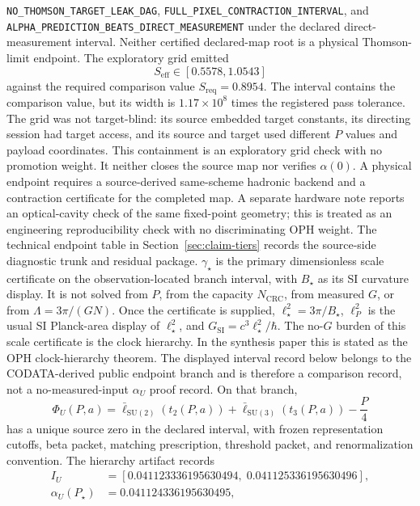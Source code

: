 \documentclass[11pt]{article}
\begin{document}
\texttt{NO\_\allowbreak THOMSON\_\allowbreak TARGET\_\allowbreak LEAK\_\allowbreak DAG},
\texttt{FULL\_\allowbreak PIXEL\_\allowbreak CONTRACTION\_\allowbreak INTERVAL}, and
\texttt{ALPHA\_\allowbreak PREDICTION\_\allowbreak BEATS\_\allowbreak DIRECT\_\allowbreak MEASUREMENT} under the
declared direct-measurement interval.
Neither certified declared-map root is a physical Thomson-limit endpoint. The
exploratory grid emitted
\[
S_{\mathrm{eff}}\in[0.5578,1.0543]
\]
against the required comparison value \(S_{\mathrm{req}}=0.8954\).  The interval
contains the comparison value, but its width is \(1.17\times10^8\) times the
registered pass tolerance. The grid was not target-blind: its source embedded target
constants, its directing session had target access, and its source and target
used different \(P\) values and payload coordinates. This containment is an
exploratory grid check with no promotion weight. It neither closes the source map nor verifies
\(\alpha(0)\).  A physical endpoint requires a source-derived same-scheme
hadronic backend and a contraction certificate for the completed map.
A separate hardware note reports an optical-cavity check of the same fixed-point
geometry; this is treated as an engineering reproducibility check with no discriminating OPH
weight. The technical
endpoint table in Section~\ref{sec:claim-tiers} records the source-side diagnostic
trunk and residual package.
\(\gamma_\star\) is the primary dimensionless scale certificate on the observation-located branch
interval, with \(B_\star\) as its SI curvature display. It is not solved from \(P\), from the
capacity \(N_{\mathrm{CRC}}\), from measured \(G\), or from \(\Lambda=3\pi/(GN)\). Once the
certificate is supplied, \(\ell_\star^2=3\pi/B_\star\), \(\ell_P^2\) is the usual SI
Planck-area display of \(\ell_\star^2\), and
\(G_{\mathrm{SI}}=c^3\ell_\star^2/\hbar\).
The no-\(G\) burden of this scale certificate is the clock hierarchy. In the synthesis paper
this is stated as the OPH clock-hierarchy theorem. The displayed interval record below belongs to
the CODATA-derived public endpoint branch and is therefore a comparison record, not a
no-measured-input \(\alpha_U\) proof record. On that branch,
\[
\Phi_U(P,a)
=
\bar\ell_{\mathrm{SU}(2)}(t_2(P,a))
+
\bar\ell_{\mathrm{SU}(3)}(t_3(P,a))
-
\frac{P}{4}
\]
has a unique source zero in the declared interval, with frozen representation cutoffs, beta
packet, matching prescription, threshold packet, and renormalization convention. The hierarchy
artifact records
\[
\begin{aligned}
I_U&=[0.041123336195630494,\;0.041125336195630496],\\
\alpha_U(P_\star)&=0.041124336195630495,
\end{aligned}
\]
\end{document}
